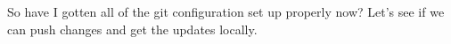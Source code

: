 %
%
\specialreq             %

So have I gotten all of the git configuration set up properly now? Let's see if
we can push changes and get the updates locally.
